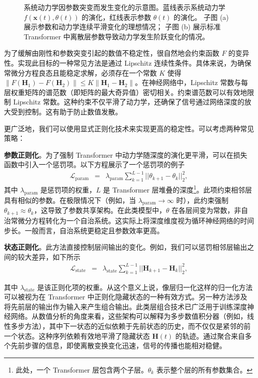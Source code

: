 \begin{figure}[!t]
\centering
{}
\caption{系统动力学因参数突变而发生变化的示意图。蓝线表示系统动力学
$f(\mathbf{x}(t),\theta(t))$ 的演化，红线表示参数 $\theta(t)$ 的演化。
子图 (a) 展示参数和动力学连续平滑变化的理想情况；
子图 (b) 展示标准 Transformer 中离散层参数导致动力学发生阶跃变化的情况。}
\label{fig:dynamics-caused-by-changes-in-parameters}
\end{figure}

为了缓解由刚性和参数突变引起的数值不稳定性，很自然地会约束函数 $F$ 的变异性。实现此目标的一种常见方法是通过 Lipschitz 连续性条件。具体来说，为确保常微分方程良态且能稳定求解，必须存在一个常数 $K$ 使得 $\|F(\mathbf{H}_1) - F(\mathbf{H}_2)\| \le K \|\mathbf{H}_1 - \mathbf{H}_2\|$。在神经网络中，Lipschitz 常数与每层权重矩阵的谱范数（即矩阵的最大奇异值）密切相关。约束谱范数可以有效地限制 Lipschitz 常数。这种约束不仅平滑了动力学，还确保了信号通过网络深度的放大受到控制。这有助于防止数值发散。

更广泛地，我们可以使用显式正则化技术来实现更高的稳定性。可以考虑两种常见策略：

\textbf{参数正则化}。为了强制 Transformer 中动力学随深度的演化更平滑，可以在损失函数中引入一个惩罚项。以下方程展示了一个惩罚项的例子
\begin{eqnarray}
\mathcal{L}_{\text{param}} & = & \lambda_{\text{param}} \sum_{k=1}^{L-1} || \theta_{k+1} - \theta_{k} ||_2^2,
\end{eqnarray}
\noindent 其中 $\lambda_{\text{param}}$ 是惩罚项的权重，$L$ 是 Transformer 层堆叠的深度\footnote{此处，一个 Transformer 层包含两个子层。$\theta_k$ 表示整个层的所有参数集合。}。此项约束相邻层具有相似的参数。在极限情况下（例如，当 $\lambda_{\text{param}} \to \infty$ 时），此约束强制 $\theta_{k+1} \approx \theta_k$，这导致了参数共享架构。在此类模型中，$\theta$ 在各层间变为常数，非自治常微分方程转化为一个自治系统。这实际上将深度维度视为循环神经网络的时间步长。一般而言，自治系统更稳定且参数效率更高。

\textbf{状态正则化}。此方法直接控制层间输出的变化。例如，我们可以惩罚相邻层输出之间的较大差异，如下所示
\begin{eqnarray}
\mathcal{L}_{\text{state}} & = & \lambda_{\text{state}} \sum_{k=1}^{L-1} || \mathbf{H}_{k+1} - \mathbf{H}_{k} ||_2^2,
\end{eqnarray}

其中 $\lambda_{\text{state}}$ 是该正则化项的权重。从这个意义上说，像层归一化这样的归一化方法可以被视为在 Transformer 中正则化隐藏状态的一种有效方式。另一种方法涉及将先前层的输出作为输入来产生组合输出。此类层组合技术已广泛用于训练深度神经网络。从数值分析的角度来看，这些架构可以解释为多步数值积分器（例如，线性多步方法），其中下一状态的近似依赖于先前状态的历史，而不仅仅是紧邻的前一个状态。这种序列依赖有效地平滑了隐藏状态 $\mathbf{H}(t)$ 的轨迹。通过聚合来自多个先前步骤的信息，即使离散变换变化迅速，信号的传播也能相对稳健。

